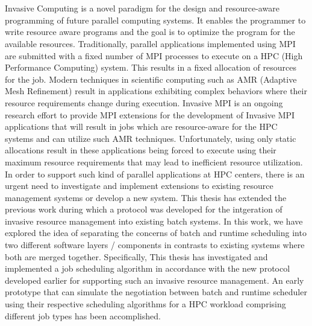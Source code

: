 \chapter{\abstractname}
Invasive Computing is a novel paradigm for the design and resource-aware programming of future parallel computing systems. It enables the programmer to write resource aware programs and the goal is to optimize the program for the available resources. Traditionally, parallel applications implemented using MPI are submitted with a fixed number of MPI processes to execute on a HPC (High Performance Computing) system. This results in a fixed allocation of resources for the job. Modern techniques in scientific computing such as AMR (Adaptive Mesh Refinement) result in applications exhibiting complex behaviors where their resource requirements change during execution. Invasive MPI is an ongoing research effort to provide MPI extensions for the development of Invasive MPI applications that will result in jobs which are resource-aware for the HPC systems and can utilize such AMR techniques. Unfortunately, using only static allocations result in these applications being forced to execute using their maximum resource requirements that may lead to inefficient resource utilization. In order to support such kind of parallel applications at HPC centers, there is an urgent need to investigate and implement extensions to existing resource management systems or develop a new system. This thesis has extended the previous work during which a protocol was developed for the intgeration of invasive resource management into existing batch systems. In this work, we have explored the idea of separating the concerns of batch and runtime scheduling into two different software layers / components in contrasts to existing systems where both are merged together. Specifically, This thesis has investigated and implemented a job scheduling algorithm in accordance with the new protocol developed earlier for supporting such an invasive resource management. An early prototype that can simulate the negotiation between batch and runtime scheduler using their respective scheduling algorithms for a HPC workload comprising different job types has been accomplished.\par



